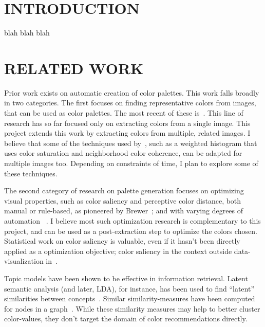\documentclass{article}
\begin{document}



\section{INTRODUCTION}
blah blah blah 

\section{RELATED WORK}
Prior work exists on automatic creation of color palettes. This work falls broadly in two categories. The first focuses on finding representative  colors from images, that can be used as color palettes. The most recent of these is~\cite{morse2007image}. This line of research has so far focused only on extracting colors from a single image. This project extends this work by extracting colors from multiple, related images. I believe that some of the techniques used by~\cite{morse2007image}, such as a weighted histogram that uses color saturation and neighborhood color coherence, can be adapted for multiple images too. Depending on constraints of time, I plan to explore some of these techniques.
	
The second category of research on palette generation focuses on optimizing visual properties, such as color saliency and perceptive color distance, both manual or rule-based, as pioneered by Brewer~\cite{brewer1999color}; and  with varying degrees of automation ~\cite{healey1996choosing, zeileis2009RGBland}. I believe most such optimization research is complementary to this project, and can be used as a post-extraction step to optimize the colors chosen. Statistical work on color saliency is valuable, even if it hasn't been directly applied as a optimization objective; color saliency in the context outside data-visualization in~\cite{chuang2008probabilistic, benavente2002statistical}. 

Topic models have been shown to be effective in information retrieval. Latent semantic analysis (and later, LDA), for instance, has been used to find ``latent'' similarities between concepts~\cite{dumais1988using, blei2003latent}. Similar similarity-measures have been computed for nodes in a graph~\cite{jeh2002simrank}. While these similarity measures may help to better cluster color-values, they don't target the domain of color recommendations directly. 
\end{document}
